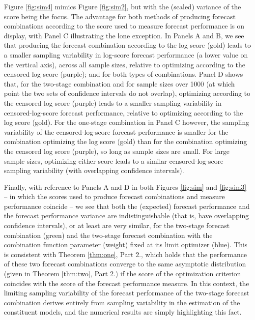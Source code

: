 \documentclass[12pt]{article}
\theoremstyle{definition}
\theoremstyle{remark}
\begin{document}
Figure \ref{fig:sim4} mimics Figure \ref{fig:sim2}, but with the (scaled) variance of the score being the focus. The advantage for both methods of producing forecast combinations according to the score used to measure forecast performance is on display, with Panel C illustrating the lone exception. In Panels A and B, we see that producing the forecast combination according to the log score (gold) leads to a smaller sampling variability in log-score forecast performance (a lower value on the vertical axis), across all sample sizes, relative to optimizing according to the censored log score (purple); and for both types of combinations. Panel D shows that, for the two-stage combination and for sample sizes over 1000 (at which point the two sets of confidence intervals do not overlap), optimizing according to the censored log score (purple) leads to a smaller sampling variability in censored-log-score forecast performance, relative to optimizing according to the log score (gold). For the one-stage combination in Panel C however, the sampling variability of the censored-log-score forecast performance is smaller for the combination optimizing the log score (gold) than for the combination optimizing the censored log score (purple), so long as sample sizes are small. For large sample sizes, optimizing either score leads to a similar censored-log-score sampling variability (with overlapping confidence intervals).

Finally, with reference to Panels A and D in both Figures \ref{fig:sim} and \ref{fig:sim3} -- in which the scores used to produce forecast combinations and measure performance coincide -- we see that both the (expected) forecast performance and the forecast performance variance are indistinguishable (that is, have overlapping confidence intervals), or at least are very similar, for the two-stage forecast combination (green) and the two-stage forecast combination with the combination function parameter (weight) fixed at its limit optimizer (blue). This is consistent with Theorem \ref{thm:one}, Part 2., which holds that the performance of these two forecast combinations converge to the same asymptotic distribution (given in Theorem \ref{thm:two}, Part 2.) if the score of the optimization criterion coincides with the score of the forecast performance measure. In this context, the limiting sampling variability of the forecast performance of the two-stage forecast combination derives entirely from sampling variability in the estimation of the constituent models, and the numerical results are simply highlighting this fact.
\end{document}
